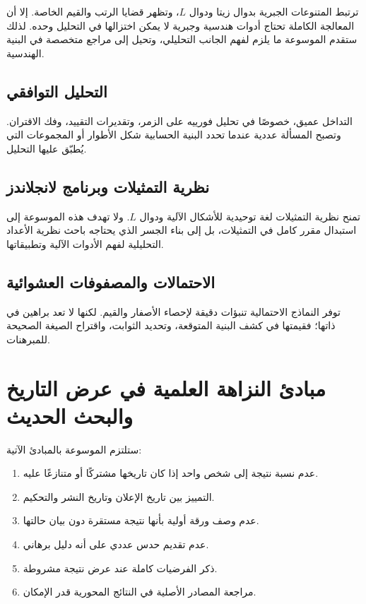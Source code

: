 ترتبط المتنوعات الجبرية بدوال زيتا ودوال \(L\)، وتظهر قضايا الرتب والقيم الخاصة. إلا أن المعالجة الكاملة تحتاج أدوات هندسية وجبرية لا يمكن اختزالها في التحليل وحده. لذلك ستقدم الموسوعة ما يلزم لفهم الجانب التحليلي، وتحيل إلى مراجع متخصصة في البنية الهندسية.

\subsection{التحليل التوافقي}

التداخل عميق، خصوصًا في تحليل فورييه على الزمر، وتقديرات التقييد، وفك الاقتران. وتصبح المسألة عددية عندما تحدد البنية الحسابية شكل الأطوار أو المجموعات التي يُطبّق عليها التحليل.

\subsection{نظرية التمثيلات وبرنامج لانجلاندز}

تمنح نظرية التمثيلات لغة توحيدية للأشكال الآلية ودوال \(L\). ولا تهدف هذه الموسوعة إلى استبدال مقرر كامل في التمثيلات، بل إلى بناء الجسر الذي يحتاجه باحث نظرية الأعداد التحليلية لفهم الأدوات الآلية وتطبيقاتها.

\subsection{الاحتمالات والمصفوفات العشوائية}

توفر النماذج الاحتمالية تنبؤات دقيقة لإحصاء الأصفار والقيم. لكنها لا تعد براهين في ذاتها؛ فقيمتها في كشف البنية المتوقعة، وتحديد الثوابت، واقتراح الصيغة الصحيحة للمبرهنات.

\section{مبادئ النزاهة العلمية في عرض التاريخ والبحث الحديث}

ستلتزم الموسوعة بالمبادئ الآتية:

\begin{enumerate}
  \item عدم نسبة نتيجة إلى شخص واحد إذا كان تاريخها مشتركًا أو متنازعًا عليه.
  \item التمييز بين تاريخ الإعلان وتاريخ النشر والتحكيم.
  \item عدم وصف ورقة أولية بأنها نتيجة مستقرة دون بيان حالتها.
  \item عدم تقديم حدس عددي على أنه دليل برهاني.
  \item ذكر الفرضيات كاملة عند عرض نتيجة مشروطة.
  \item مراجعة المصادر الأصلية في النتائج المحورية قدر الإمكان.
\end{enumerate}

